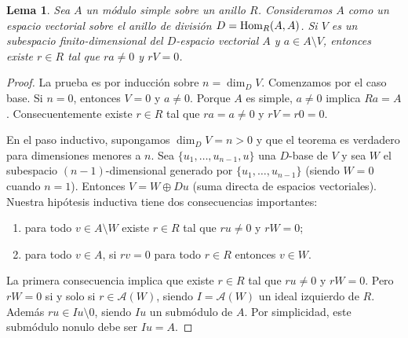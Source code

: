 \documentclass{report}
\newcommand{\Hom}{\textnormal{Hom}}
\newtheorem{lemma}{Lema}
\begin{document}
  \begin{lemma}
    Sea \(A\) un módulo simple sobre un anillo \(R\).
    Consideramos \(A\) como un espacio vectorial sobre el anillo de división \(D = \Hom_R(A, A)\).
    Si \(V\) es un subespacio finito-dimensional del \(D\)-espacio vectorial \(A\) y \(a \in A \setminus V\), entonces existe \(r \in R\) tal que \(r a \neq 0\) y \(r V = 0\).
  \end{lemma}
  \begin{proof}
    La prueba es por inducción sobre \(n = \dim_D V\).
    Comenzamos por el caso base.
    Si \(n = 0\), entonces \(V = 0\) y \(a \neq 0\).
    Porque \(A\) es simple, \(a \neq 0\) implica \(R a = A\).
    Consecuentemente existe \(r \in R\) tal que \(r a = a \neq 0\) y \(r V = r 0 = 0\).

    En el paso inductivo, supongamos \(\dim_D V = n > 0\) y que el teorema es verdadero para dimensiones menores a \(n\).
    Sea \(\{u_1, \dots, u_{n - 1}, u\}\) una \(D\)-base de \(V\) y sea \(W\) el subespacio \((n - 1)\)-dimensional generado por \(\{u_1, \dots, u_{n - 1}\}\) (siendo \(W = 0\) cuando \(n = 1\)).
    Entonces \(V = W \oplus D u\) (suma directa de espacios vectoriales).
    Nuestra hipótesis inductiva tiene dos consecuencias importantes:
    \begin{enumerate}
      \item para todo \(v \in A \setminus W\) existe \(r \in R\) tal que \(r u \neq 0\) y \(r W = 0\);
      \item para todo \(v \in A\), si \(r v = 0\) para todo \(r \in R\) entonces \(v \in W\).
    \end{enumerate}
    La primera consecuencia implica que existe \(r \in R\) tal que \(r u \neq 0\) y \(r W = 0\).
    Pero \(r W = 0\) si y solo si \(r \in \mathcal{A}(W)\), siendo \(I = \mathcal{A}(W)\) un ideal izquierdo de \(R\).
    Además \(r u \in I u \setminus 0\), siendo \(I u\) un submódulo de \(A\).
    Por simplicidad, este submódulo nonulo debe ser \(I u = A\).


\end{proof}
\end{document}
